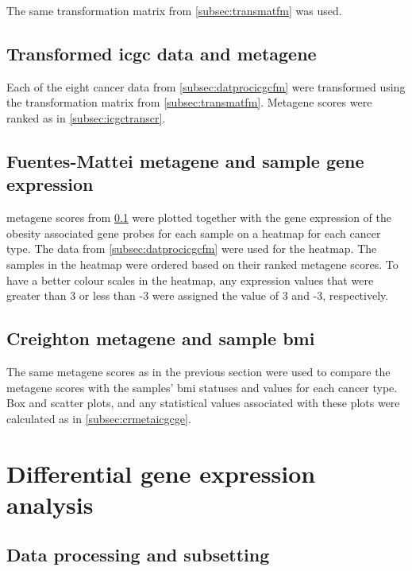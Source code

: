 The same transformation matrix from \cref{subsec:transmatfm} was used.

\subsection{Transformed \gls{icgc} data and metagene}
\label{subsec:icgctransfm}

Each of the eight cancer data from \cref{subsec:datprocicgcfm} were transformed using the transformation matrix from \cref{subsec:transmatfm}.
Metagene scores were ranked as in \cref{subsec:icgctranscr}.

\subsection{Fuentes-Mattei metagene and sample gene expression}
\label{subsec:fmmetaicgcge}

\Gls{metagene} scores from \cref{subsec:icgctransfm} were plotted together with the gene expression of the obesity associated gene probes for each sample on a heatmap for each cancer type.
The data from \cref{subsec:datprocicgcfm} were used for the heatmap.
The samples in the heatmap were ordered based on their ranked \gls{metagene} scores.
To have a better colour scales in the heatmap, any expression values that were greater than 3 or less than -3 were assigned the value of 3 and -3, respectively.

\subsection{Creighton metagene and sample \gls{bmi}}
\label{subsec:fmmetaicgcge}

The same \gls{metagene} scores as in the previous section were used to compare the \gls{metagene} scores with the samples' \gls{bmi} statuses and values for each cancer type.
Box and scatter plots, and any statistical values associated with these plots were calculated as in \cref{subsec:crmetaicgcge}.

\section{Differential gene expression analysis}
\label{sec:deg}

\subsection{Data processing and subsetting}
\label{subsec:subdatadeg}

